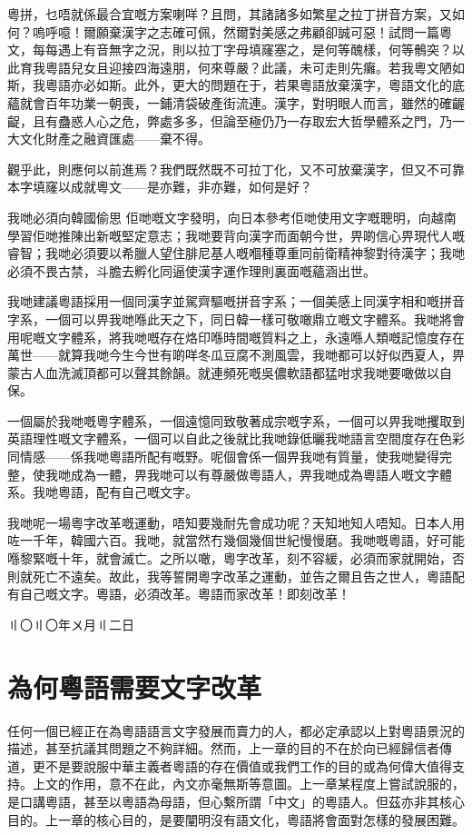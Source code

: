 \documentclass[a5paper, 12pt, openany]{book} %
\begin{document}
粵拼，乜唔就係最合宜嘅方案喇咩？且問，其諸諸多如繁星之拉丁拼音方案，又如何？嗚呼噫！爾願棄漢字之志確可佩，然爾對美感之弗顧卻誠可惡！試問一篇粵文，每每遇上有音無字之況，則以拉丁字母填窿塞之，是何等醜樣，何等鶻突？以此育我粵語兒女且迎接四海遠朋，何來尊嚴？此議，未可走則先癱。若我粵文陋如斯，我粵語亦必如斯。此外，更大的問題在于，若果粵語放棄漢字，粵語文化的底蘊就會百年功業一朝喪，一鋪清袋破產街流連。漢字，對明眼人而言，雖然的確齷齪，且有蠱惑人心之危，弊處多多，但論至極仍乃一存取宏大哲學體系之門，乃一大文化財產之融資匯處——棄不得。

觀乎此，則應何以前進焉？我們既然既不可拉丁化，又不可放棄漢字，但又不可靠本字填窿以成就粵文——是亦難，非亦難，如何是好？

我哋必須向韓國偷思 佢哋嘅文字發明，向日本參考佢哋使用文字嘅聰明，向越南學習佢哋推陳出新嘅堅定意志；我哋要背向漢字而面朝今世，畀啲信心畀現代人嘅睿智；我哋必須要以希臘人望住腓尼基人嘅嗰種尊重同前衛精神黎對待漢字；我哋必須不畏古禁，斗膽去孵化同逼使漢字運作理則裏面嘅蘊涵出世。

我哋建議粵語採用一個同漢字並駕齊驅嘅拼音字系；一個美感上同漢字相和嘅拼音字系，一個可以畀我哋喺此天之下，同日韓一樣可敬噉鼎立嘅文字體系。我哋將會用呢嘅文字體系，將我哋嘅存在烙印喺時間嘅質料之上，永遠喺人類嘅記憶度存在萬世——就算我哋今生今世有啲咩冬瓜豆腐不測風雲，我哋都可以好似西夏人，畀蒙古人血洗滅頂都可以聲其餘韻。就連頻死嘅吳儂軟語都猛咁求我哋要噉做以自保。

一個屬於我哋嘅粵字體系，一個遠憶同致敬著成宗嘅字系，一個可以畀我哋攫取到英語理性嘅文字體系，一個可以自此之後就比我哋錄低曬我哋語言空間度存在色彩同情感——係我哋粵語所配有嘅野。呢個會係一個畀我哋有質量，使我哋變得完整，使我哋成為一體，畀我哋可以有尊嚴做粵語人，畀我哋成為粵語人嘅文字體系。我哋粵語，配有自己嘅文字。

我哋呢一場粵字改革嘅運動，唔知要幾耐先會成功呢？天知地知人唔知。日本人用咗一千年，韓國六百。我哋，就當然冇幾個幾個世紀慢慢磨。我哋嘅粵語，好可能喺黎緊嘅十年，就會滅亡。之所以噉，粵字改革，刻不容緩，必須而家就開始，否則就死亡不遠矣。故此，我等誓開粵字改革之運動，並告之爾且告之世人，粵語配有自己嘅文字。粵語，必須改革。粵語而家改革！即刻改革！

〢〇〢〇年〤月〢二日

\chapter{為何粵語需要文字改革}

任何一個已經正在為粵語語言文字發展而賣力的人，都必定承認以上對粵語景況的描述，甚至抗議其問題之不夠詳細。然而，上一章的目的不在於向已經歸信者傳道，更不是要說服中華主義者粵語的存在價值或我們工作的目的或為何偉大值得支持。上文的作用，意不在此，內文亦毫無斯等意圖。上一章某程度上嘗試說服的，是口講粵語，甚至以粵語為母語，但心繫所謂「中文」的粵語人。但茲亦非其核心目的。上一章的核心目的，是要闡明沒有語文化，粵語將會面對怎樣的發展困難。
\end{document}
